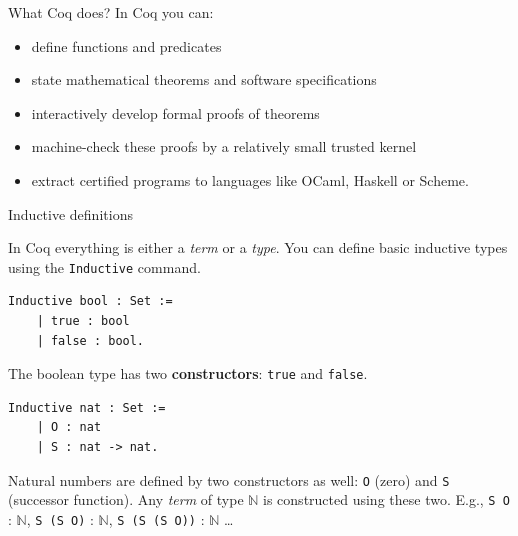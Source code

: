 \documentclass[10pt]{beamer}
\begin{document}
\begin{frame}{What Coq does?}
  In Coq you can:
  \begin{itemize}
  
    \item define functions and predicates
    \item state mathematical theorems and software specifications
    \item interactively develop formal proofs of theorems
    \item machine-check these proofs by a relatively small trusted kernel
    \item extract certified programs to languages like OCaml, Haskell or Scheme.
  \end{itemize}
  
\end{frame}


\begin{frame}[fragile]{Inductive definitions}

  In Coq everything is either a {\it term} or a {\it type}. You can define basic inductive types using the \texttt{Inductive} command.

  \begin{lstlisting}[language=Coq]
  Inductive bool : Set :=
    | true : bool
    | false : bool.

  \end{lstlisting}

  The boolean type has two {\bf constructors}: \texttt{true} and \texttt{false}.  
  
   \begin{lstlisting}[language=Coq]
  Inductive nat : Set :=
    | O : nat
    | S : nat -> nat.  
   \end{lstlisting}

   Natural numbers are defined by two constructors as well: \texttt{O} (zero) and \texttt{S} (successor function). Any {\it term} of type $\mathbb{N}$ is constructed using these two. E.g., \texttt{S O} : $\mathbb{N}$, \texttt{S (S O)} : $\mathbb{N}$, \texttt{S (S (S O))} : $\mathbb{N}$  \ldots
\end{frame}
\end{document}
